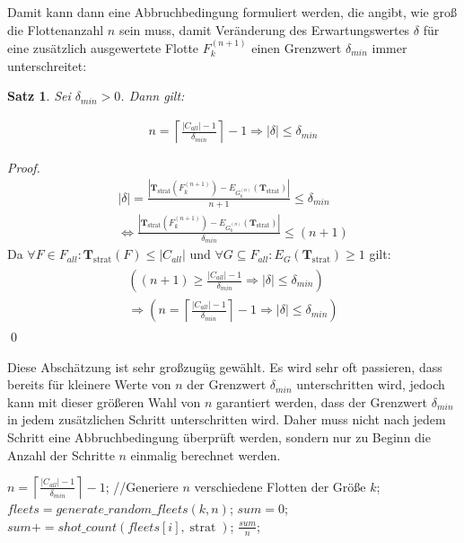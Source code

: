 \documentclass[a4paper,12pt]{llncs}
\numberwithin{equation}{section}
\newtheorem{satz}{Satz}
\DeclareMathOperator{\strat}{strat}
\begin{document}
Damit kann dann eine Abbruchbedingung formuliert werden, die angibt, wie groß die Flottenanzahl $n$ sein muss, damit Veränderung des Erwartungswertes $\delta$ für eine zusätzlich ausgewertete Flotte $F_k^{(n+1)}$ einen Grenzwert $\delta_{min}$ immer unterschreitet:

\begin{satz}
Sei $\delta_{min} > 0$.
Dann gilt:

\begin{align}
n = \left\lceil \frac{|C_{all}| - 1}{\delta_{min}} \right\rceil - 1 \Rightarrow |\delta| \leq \delta_{min}
\nonumber
\end{align}
\end{satz}

\begin{proof}
\begin{align}
|\delta|=\frac{|\mathbf{T}_{\strat}(F_k^{(n+1)}) - E_{G_k^{(n)}}(\mathbf{T}_{\strat})|}{n+1} \leq \delta_{min}\\
\Leftrightarrow \frac{|\mathbf{T}_{\strat}(F_k^{(n+1)}) - E_{G_k^{(n)}}(\mathbf{T}_{\strat})|}{\delta_{min}} \leq (n+1)
\nonumber
\end{align}
Da $\forall F \in F_{all} \colon \mathbf{T}_{\strat}(F) \leq |C_{all}|$ und $\forall G \subseteq F_{all} \colon E_{G}(\mathbf{T}_{\strat}) \geq 1$ gilt:
\begin{align}
\begin{split}
\left( (n+1) \geq \frac{|C_{all}| - 1}{\delta_{min}} \Rightarrow |\delta| \leq \delta_{min} \right)\\
\Rightarrow \left(n = \left\lceil \frac{|C_{all}| - 1}{\delta_{min}} \right\rceil - 1 \Rightarrow |\delta| \leq \delta_{min} \right)
\end{split}
\end{align}
\qed
\end{proof}

Diese Abschätzung ist sehr großzugüg gewählt. Es wird sehr oft passieren, dass bereits für kleinere Werte von $n$ der Grenzwert $\delta_{min}$ unterschritten wird, jedoch kann mit dieser größeren Wahl von $n$ garantiert werden, dass der Grenzwert $\delta_{min}$ in jedem zusätzlichen Schritt unterschritten wird. Daher muss nicht nach jedem Schritt eine Abbruchbedingung überprüft werden, sondern nur zu Beginn die Anzahl der Schritte $n$ einmalig berechnet werden.

\begin{tcolorbox}
	\begin{algorithmic}[H]
		\Function{simulate\_rounds}{$k, \strat, \delta_{min}$}{:}
		\State $n =\left\lceil \frac{|C_{all}| - 1}{\delta_{min}} \right\rceil - 1$;
		\State //Generiere $n$ verschiedene Flotten der Größe $k$;
		\State $fleets = generate\_random\_fleets(k, n)$;
		\State $sum=0$;
		\State $sum += shot\_count(fleets[i], \strat)$;
		\EndFor
		\State\Return $\frac{sum}{n}$;
		\EndFunction
	\end{algorithmic}
\end{tcolorbox}
\end{document}
